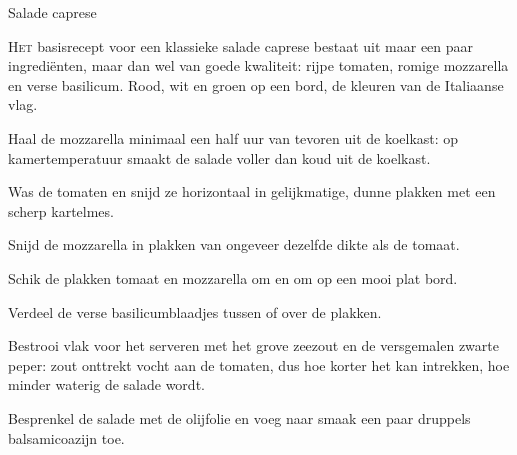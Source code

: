 \begin{recipe}{Salade caprese}


\lettrine{H}{et} basisrecept voor een klassieke salade caprese bestaat uit maar een
paar ingrediënten, maar dan wel van goede kwaliteit: rijpe tomaten, romige
mozzarella en verse basilicum. Rood, wit en groen op een bord, de kleuren van
de Italiaanse vlag.

\begin{ingredients}
\end{ingredients}

\begin{steps}
  \item Haal de mozzarella minimaal een half uur van tevoren uit de koelkast:
        op kamertemperatuur smaakt de salade voller dan koud uit de koelkast.
  \item Was de tomaten en snijd ze horizontaal in gelijkmatige, dunne plakken
        met een scherp kartelmes.
  \item Snijd de mozzarella in plakken van ongeveer dezelfde dikte als de
        tomaat.
  \item Schik de plakken tomaat en mozzarella om en om op een mooi plat bord.
  \item Verdeel de verse basilicumblaadjes tussen of over de plakken.
  \item Bestrooi vlak voor het serveren met het grove zeezout en de
        versgemalen zwarte peper: zout onttrekt vocht aan de tomaten, dus hoe
        korter het kan intrekken, hoe minder waterig de salade wordt.
  \item Besprenkel de salade met de olijfolie en voeg naar smaak een paar
        druppels balsamicoazijn toe.
\end{steps}
\end{recipe}
